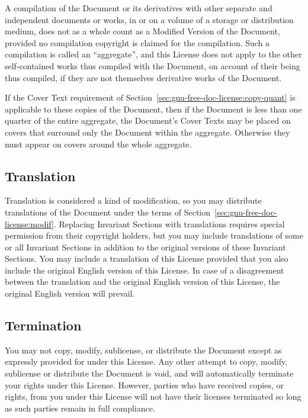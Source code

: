 \documentclass[11pt,a4paper,oneside]{alb-corp}
\begin{document}
A compilation of the Document or its derivatives with other separate and
independent documents or works, in or on a volume of a storage or
distribution medium, does not as a whole count as a Modified Version of
the Document, provided no compilation copyright is claimed for the
compilation.  Such a compilation is called an ``aggregate'', and this
License does not apply to the other self-contained works thus compiled
with the Document, on account of their being thus compiled, if they are
not themselves derivative works of the Document.

If the Cover Text requirement of
Section~\ref{sec:gnu-free-doc-license:copy-quant} is applicable to these
copies of the Document, then if the Document is less than one quarter of
the entire aggregate, the Document's Cover Texts may be placed on covers
that surround only the Document within the aggregate.  Otherwise they
must appear on covers around the whole aggregate.


\subsection{Translation}
\label{sec:gnu-free-doc-license:transl}

Translation is considered a kind of modification, so you may distribute
translations of the Document under the terms of
Section~\ref{sec:gnu-free-doc-license:modif}.  Replacing Invariant
Sections with translations requires special permission from their
copyright holders, but you may include translations of some or all
Invariant Sections in addition to the original versions of these
Invariant Sections.  You may include a translation of this License
provided that you also include the original English version of this
License.  In case of a disagreement between the translation and the
original English version of this License, the original English version
will prevail.


\subsection{Termination}
\label{sec:gnu-free-doc-license:term}

You may not copy, modify, sublicense, or distribute the Document except
as expressly provided for under this License.  Any other attempt to
copy, modify, sublicense or distribute the Document is void, and will
automatically terminate your rights under this License.  However,
parties who have received copies, or rights, from you under this License
will not have their licenses terminated so long as such parties remain
in full compliance.
\end{document}
